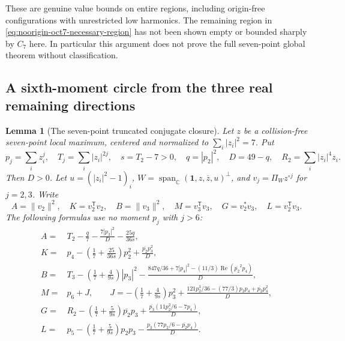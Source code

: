\documentclass[11pt]{article}
\newtheorem{lemma}[theorem]{Lemma}
\theoremstyle{remark}
\numberwithin{equation}{section}
\begin{document}
These are genuine value bounds on entire regions, including
origin-free configurations with unrestricted low harmonics.
The remaining region in \eqref{eq:noorigin-oct7-necessary-region}
has not been shown empty or bounded sharply by $C_7$ here. In
particular this argument does not prove the full seven-point
global theorem without classification.

\subsection{A sixth-moment circle from the three real remaining directions}
\label{sec:noorigin-oct7-projection}

\begin{lemma}[The seven-point truncated conjugate closure]
\label{lem:noorigin-oct7-truncated-closure}
Let $z$ be a collision-free seven-point local maximum, centered and
normalized to $\sum_i|z_i|^2=7$. Put
\[
 p_j=\sum_i z_i^j,\quad T_j=\sum_i|z_i|^{2j},\quad
 s=T_2-7>0,\quad q=|p_2|^2,\quad D=49-q,\quad
 R_2=\sum_i|z_i|^4z_i.
\]
Then $D>0$. Let $u=(|z_i|^2-1)_i$,
$W=\operatorname{span}_{\mathbb C}(\mathbf1,z,\overline z,u)^\perp$,
and $v_j=\Pi_Wz^{\circ j}$ for $j=2,3$. Write
\[
 A=\|v_2\|^2,\quad K=v_2^{\mathsf T}v_2,\quad
 B=\|v_3\|^2,\quad M=v_3^{\mathsf T}v_3,\quad
 G=v_2^*v_3,\quad L=v_2^{\mathsf T}v_3.
\]
The following formulas use no moment $p_j$ with $j>6$:
\begin{align}
 A={}&T_2-\frac q7-\frac{7|p_3|^2}{D}-\frac{25q}{36s},
       \label{eq:noorigin-oct7-A}\\
 K={}&p_4-\left(\frac17+\frac{25}{36s}\right)p_2^2
                 +\frac{\overline{p_2}p_3^2}{D},
       \label{eq:noorigin-oct7-K}\\
 B={}&T_3-\left(\frac17+\frac4{9s}\right)|p_3|^2
       -\frac{847q/36+7|p_4|^2-(11/3)
                 \operatorname{Re}(\overline{p_2}^{2}p_4)}D,
       \label{eq:noorigin-oct7-B}\\
 M={}&p_6+J,\qquad
 J=-\left(\frac17+\frac4{9s}\right)p_3^2
       +\frac{121p_2^3/36-(77/3)p_2p_4+\overline{p_2}p_4^2}{D},
       \label{eq:noorigin-oct7-J}\\
 G={}&R_2-\left(\frac17+\frac5{9s}\right)\overline{p_2}p_3
       +\frac{\overline{p_3}(11p_2^2/6-7p_4)}D,
       \label{eq:noorigin-oct7-G}\\
 L={}&p_5-\left(\frac17+\frac5{9s}\right)p_2p_3
       -\frac{p_3(77p_2/6-\overline{p_2}p_4)}D.
       \label{eq:noorigin-oct7-L}
\end{align}

\end{lemma}
\end{document}
